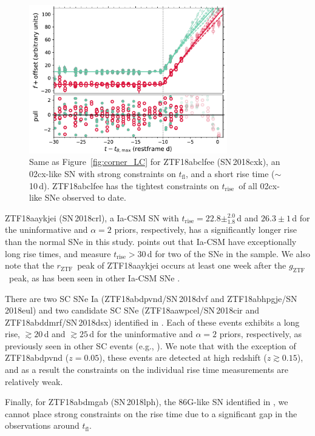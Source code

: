 \documentclass[twocolumn]{./aastex63}
\newcommand{\rztf}{$r_\mathrm{ZTF}$}
\newcommand{\gztf}{$g_\mathrm{ZTF}$}
\newcommand{\tfl}{$t_\mathrm{fl}$}
\newcommand{\trise}{$t_\mathrm{rise}$}
\begin{document}
\begin{figure}
    \centering
    \includegraphics[width=3.4in]{./figures/ZTF18abclfee_model_lc.pdf}
    \caption{Same as Figure~\ref{fig:corner_LC} for ZTF18abclfee (SN\,2018cxk),
    an 02cx-like SN with strong constraints on \tfl, and a short rise time
    ($\sim$10\,d). ZTF18abclfee has the tightest constraints on \trise\ of all
    02cx-like SNe observed to date.}
    \label{fig:02cx}
\end{figure}

ZTF18aaykjei (SN\,2018crl), a Ia-CSM SN with \trise$ = 22.8
\pm^{2.0}_{1.8}$\,d and $26.3 \pm 1$\,d for the uninformative and $\alpha = 2$
priors, respectively, has a significantly longer rise than the normal SNe in
this study. \citet{Silverman13} points out that Ia-CSM have exceptionally long
rise times, and \citet{Firth15} measure \trise$ > 30$\,d for two of the SNe in
the \citet{Silverman13} sample. We also note that the \rztf\ peak of
ZTF18aaykjei occurs at least one week after the \gztf\ peak, as has been seen
in other Ia-CSM SNe \citep{aldering05gj,prieto05gj}.

There are two SC SNe Ia (ZTF18abdpvnd/SN\,2018dvf and
ZTF18abhpgje/SN\,2018eul) and two candidate SC SNe (ZTF18aawpcel/SN\,2018cir
and ZTF18abddmrf/SN\,2018dsx) identified in \citet{Yao19}. Each of these
events exhibits a long rise, $\gtrsim 20$\,d and $\gtrsim 25$\,d for the
uninformative and $\alpha=2$ priors, respectively, as previously seen in other
SC events (e.g., \citealt{Scalzo10,Silverman11}). We note that with the
exception of ZTF18abdpvnd ($z = 0.05$), these events are detected at high
redshift ($z \gtrsim 0.15$), and as a result the constraints on the individual
rise time measurements are relatively weak.

Finally, for ZTF18abdmgab (SN\,2018lph), the 86G-like SN identified in
\citet{Yao19}, we cannot place strong constraints on the rise time due to a
significant gap in the observations around \tfl.
\end{document}
